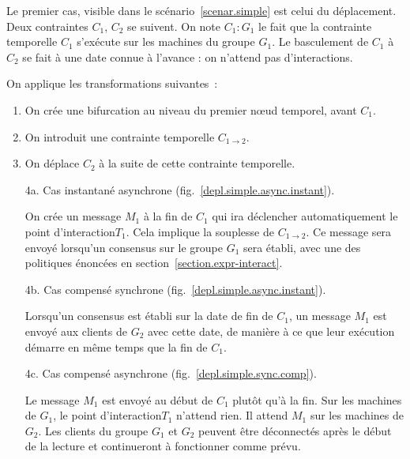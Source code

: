 \documentclass[10pt]{article}
\newcommand\timenode{nœud temporel\xspace}
\newcommand\trigger{point d'interaction\xspace}
\begin{document}
Le premier cas, visible dans le scénario~\ref{scenar.simple} est celui du déplacement.
Deux contraintes $C_1$, $C_2$ se suivent. 
On note $C_1 : G_1$ le fait que la contrainte temporelle $C_1$ s'exécute sur les machines du groupe $G_1$.
Le basculement de $C_1$ à $C_2$ se fait à une date connue à l'avance : on n'attend pas d'interactions.


On applique les transformations suivantes~: 
\begin{enumerate}
    \item On crée une bifurcation au niveau du premier \timenode, avant $C_1$.
    \item On introduit une contrainte temporelle $C_{1\rightarrow2}$.
    \item On déplace $C_2$ à la suite de cette contrainte temporelle.
    \item[4a.] Cas instantané asynchrone (fig.~\ref{depl.simple.async.instant}).
    
    On crée un message $M_1$ à la fin de $C_1$ qui ira déclencher automatiquement le \trigger $T_1$. 
    Cela implique la souplesse de $C_{1\rightarrow2}$.
    Ce message sera envoyé lorsqu'un consensus sur le groupe $G_1$ sera établi, avec une des politiques énoncées en section~\ref{section.expr-interact}.
    \item[4b.] Cas compensé synchrone (fig.~\ref{depl.simple.async.instant}).
    
    Lorsqu'un consensus est établi sur la date de fin de $C_1$, un message $M_1$ est envoyé aux clients de $G_2$ avec cette date, de manière à ce que leur exécution démarre en même temps que la fin de $C_1$.
    \item[4c.] Cas compensé asynchrone (fig.~\ref{depl.simple.sync.comp}). 
    
    Le message $M_1$ est envoyé au début de $C_1$ plutôt qu'à la fin.
    Sur les machines de $G_1$, le \trigger $T_1$ n'attend rien. Il attend $M_1$ sur les machines de $G_2$.
    Les clients du groupe $G_1$ et $G_2$ peuvent être déconnectés après le début de la lecture et continueront à fonctionner comme prévu.
\end{enumerate}
\end{document}
